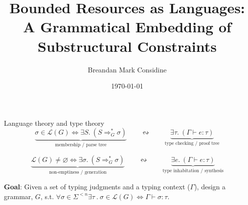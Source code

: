 \documentclass{beamer}
\title{Bounded Resources as Languages:\\\small{A Grammatical Embedding of Substructural Constraints}}
\author{Breandan Mark Considine}
\date{\today}
\begin{document}
\begin{frame}
  \titlepage
\end{frame}

\begin{frame}{Language theory and type theory}
  \vspace{-0.3cm}
    \[
      \underbrace{\sigma \in \mathcal{L}(G) \Leftrightarrow  \exists S.\ (S \Rightarrow_G^{\!*} \sigma)}_{\text{membership / parse tree}}
      \qquad\leftrightsquigarrow\qquad
      \underbrace{\exists \tau .\ (\Gamma \vdash e : \tau)}_{\text{type checking / proof tree}}
    \]
\vspace{0.2cm}
    \begin{prooftree}
    \end{prooftree}

    \[
      \underbrace{\mathcal{L}(G) \neq \varnothing \Leftrightarrow \exists \sigma.\ (S \Rightarrow_G^{\!*} \sigma)}_{\text{non-emptiness / generation}}
      \qquad\leftrightsquigarrow\qquad
      \underbrace{\exists e .\ (\Gamma \vdash e : \tau)}_{\text{type inhabitation / synthesis}}
    \]

  \vspace{0.3cm}
      \textbf{Goal}: Given a set of typing judgments and a typing context ($\Gamma$), design a grammar, $G$, s.t. $\forall \sigma\in\Sigma^{<n} \exists \tau\ .\ \sigma \in \mathcal{L}(G)\Longleftrightarrow\Gamma\vdash\sigma:\tau$.
\end{frame}
\end{document}
